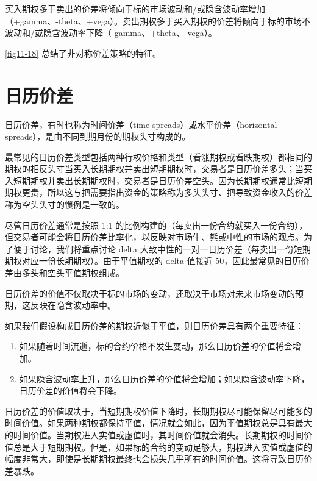 买入期权多于卖出的价差将倾向于标的市场波动和/或隐含波动率增加（+gamma、-theta、+vega）。卖出期权多于买入期权的价差将倾向于标的市场不波动和/或隐含波动率下降（-gamma、+theta、-vega）。


\autoref{fig11-18} 总结了非对称价差策略的特征。

\section{日历价差}
日历价差，有时也称为时间价差（time spreads）或水平价差（horizontal spreads），是由不同到期月份的期权头寸构成的。

最常见的日历价差类型包括两种行权价格和类型（看涨期权或看跌期权）都相同的期权的相反头寸当买入长期期权并卖出短期期权时，交易者是日历价差多头；当买入短期期权并卖出长期期权时，交易者是日历价差空头。因为长期期权通常比短期期权更贵，所以这与把需要指出资金的策略称为多头头寸、把导致资金收入的价差称为空头头寸的惯例是一致的。


尽管日历价差通常是按照 1:1 的比例构建的（每卖出一份合约就买入一份合约），但交易者可能会将日历价差比率化，以反映对市场牛、熊或中性的市场的观点。为了便于讨论，我们将重点讨论 delta 大致中性的一对一日历价差（每卖出一份短期期权对应一份长期期权）。由于平值期权的 delta 值接近 50，因此最常见的日历价差由多头和空头平值期权组成。

日历价差的价值不仅取决于标的市场的变动，还取决于市场对未来市场变动的预期，这反映在隐含波动率中。

如果我们假设构成日历价差的期权近似于平值，则日历价差具有两个重要特征：
\begin{enumerate}
    \item 如果随着时间流逝，标的合约价格不发生变动，那么日历价差的价值将会增加。
    \item 如果隐含波动率上升，那么日历价差的价值将会增加；如果隐含波动率下降，日历价差的价值将会下降。
\end{enumerate}

日历价差的价值取决于，当短期期权价值下降时，长期期权尽可能保留尽可能多的时间价值。如果两种期权都保持平值，情况就会如此，因为平值期权总是具有最大的时间价值。当期权进入实值或虚值时，其时间价值就会消失。长期期权的时间价值总是大于短期期权。但是，如果标的合约的变动足够大，期权进入实值或虚值的幅度非常大，即使是长期期权最终也会损失几乎所有的时间价值。这将导致日历价差暴跌。

